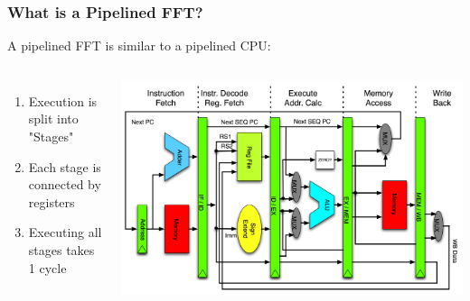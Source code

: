 \documentclass{beamer}
\begin{document}
\begin{frame}
	\frametitle{What is a Pipelined FFT?}
	A pipelined FFT is similar to a pipelined CPU:
	\begin{columns}
		\begin{enumerate}
			\item Execution is split into "Stages"
			\pause
			\item Each stage is connected by registers
			\pause
			\item Executing all stages takes 1 cycle
		\end{enumerate}
		\onslide
		\centering
		\includegraphics[width=\linewidth]{Pipeline_MIPS.png}
	\end{columns}

\end{frame}
\end{document}

